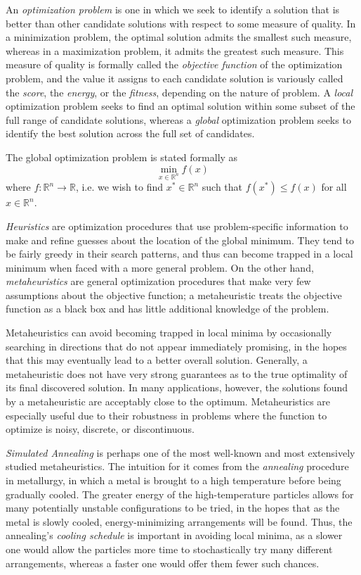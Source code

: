 \documentclass[12pt]{article}
\begin{document}
An \emph{optimization problem} is one in which we seek to identify a solution
that is better than other candidate solutions with respect to some measure
of quality.
In a minimization problem, the optimal solution admits the smallest
such measure, whereas in a maximization problem, it admits the greatest such
measure.
This measure of quality is formally called the \emph{objective function} of the
optimization problem, and the value it assigns to each candidate solution is
variously called the \emph{score}, the \emph{energy}, or the \emph{fitness},
depending on the nature of problem.
A \emph{local} optimization problem seeks to find an optimal solution within
some subset of the full range of candidate solutions, whereas a \emph{global}
optimization problem seeks to identify the best solution across the full set of
candidates.

The global optimization problem is stated formally as
$$
\min_{x \in \mathbb{R}^n} f(x)
$$
where $f : \mathbb{R}^n \to \mathbb{R}$,
i.e. we wish to find $x^* \in \mathbb{R}^n$
such that $f(x^*) \leq f(x)$ for all $x \in \mathbb{R}^n$.

\emph{Heuristics} are optimization procedures that use problem-specific
information to make and refine guesses about the location of the global
minimum.  They tend to be fairly greedy in their search patterns, and thus can
become trapped in a local minimum when faced with a more general problem.
On the other hand, \emph{metaheuristics} are general optimization procedures
that make very few assumptions about the objective function; a metaheuristic
treats the objective function as a black box and has little additional
knowledge of the problem.

Metaheuristics can avoid becoming trapped in local minima by occasionally
searching in directions that do not appear immediately promising, in the hopes
that this may eventually lead to a better overall solution.
Generally, a metaheuristic does not have very strong guarantees as to the true
optimality of its final discovered solution. In many applications, however, the
solutions found by a metaheuristic are acceptably close to the optimum.
Metaheuristics are especially useful due to their robustness in problems where
the function to optimize is noisy, discrete, or discontinuous.

\emph{Simulated Annealing}\cite{kirkpatrick1983} is perhaps one of the most
well-known and most extensively studied metaheuristics.
The intuition for it comes from the \emph{annealing} procedure in
metallurgy, in which a metal is brought to a high temperature before being
gradually cooled.
The greater energy of the high-temperature particles allows for many
potentially unstable configurations to be tried, in the hopes that as the
metal is slowly cooled, energy-minimizing arrangements will be found.
Thus, the annealing's \emph{cooling schedule} is important in avoiding
local minima, as a slower one would allow the particles more time to
stochastically try many different arrangements, whereas a faster one would
offer them fewer such chances.
\end{document}
